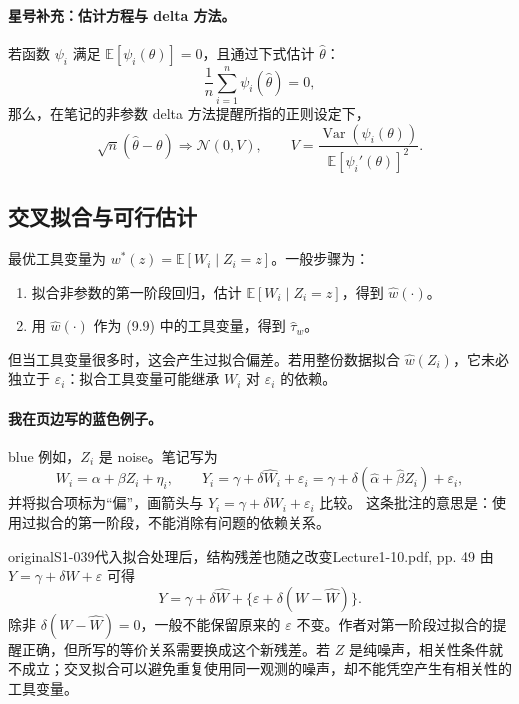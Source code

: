 \paragraph{星号补充：估计方程与 delta 方法。}
若函数 $\psi_i$ 满足 $\mathbb E[\psi_i(\theta)]=0$，且通过下式估计 $\widehat\theta$：
\[
 \frac1n\sum_{i=1}^n\psi_i(\widehat\theta)=0,
\]
那么，在笔记的非参数 delta 方法提醒所指的正则设定下，
\[
 \sqrt n(\widehat\theta-\theta)\Rightarrow\mathcal N(0,V),
 \qquad
 V=\frac{\operatorname{Var}(\psi_i(\theta))}
 {\mathbb E[\psi_i'(\theta)]^2}.
\]

\subsection{交叉拟合与可行估计}
最优工具变量为 $w^*(z)=\mathbb E[W_i\mid Z_i=z]$。一般步骤为：
\begin{enumerate}
 \item 拟合非参数的第一阶段回归，估计 $\mathbb E[W_i\mid Z_i=z]$，得到 $\widehat w(\cdot)$。
 \item 用 $\widehat w(\cdot)$ 作为 (9.9) 中的工具变量，得到 $\widehat\tau_w$。
\end{enumerate}
但当工具变量很多时，这会产生过拟合偏差。若用整份数据拟合 $\widehat w(Z_i)$，它未必独立于 $\varepsilon_i$：拟合工具变量可能继承 $W_i$ 对 $\varepsilon_i$ 的依赖。

\paragraph{我在页边写的蓝色例子。}
\begin{inkblock}{blue}
例如，$Z_i$ 是 noise。笔记写为
\[
 W_i=\alpha+\beta Z_i+\eta_i,
 \qquad Y_i=\gamma+\delta\widehat W_i+\varepsilon_i
 =\gamma+\delta(\widehat\alpha+\widehat\beta Z_i)+\varepsilon_i,
\]
并将拟合项标为“偏”，画箭头与 $Y_i=\gamma+\delta W_i+\varepsilon_i$ 比较。
这条批注的意思是：使用过拟合的第一阶段，不能消除有问题的依赖关系。
\end{inkblock}

\begin{reviewnote}{original}{S1-039}{代入拟合处理后，结构残差也随之改变}{Lecture1-10.pdf, pp. 49}
由 $Y=\gamma+\delta W+\varepsilon$ 可得
\[
Y=\gamma+\delta\widehat W+\{\varepsilon+\delta(W-\widehat W)\}.
\]
除非 $\delta(W-\widehat W)=0$，一般不能保留原来的 $\varepsilon$ 不变。作者对第一阶段过拟合的提醒正确，但所写的等价关系需要换成这个新残差。若 $Z$ 是纯噪声，相关性条件就不成立；交叉拟合可以避免重复使用同一观测的噪声，却不能凭空产生有相关性的工具变量。
\end{reviewnote}



